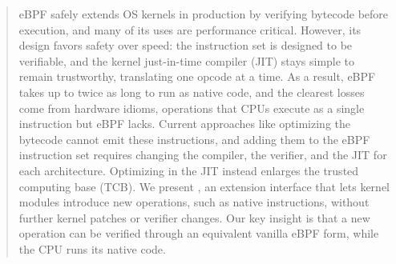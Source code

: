 \begin{abstract}
eBPF safely extends OS kernels in production by verifying bytecode before execution, and many of its uses are performance critical.
However, its design favors safety over speed: the instruction set is designed to be verifiable, and the kernel just-in-time compiler (JIT) stays simple to remain trustworthy, translating one opcode at a time.
As a result, eBPF takes up to twice as long to run as native code, and the clearest losses come from hardware idioms, operations that CPUs execute as a single instruction but eBPF lacks.
Current approaches like optimizing the bytecode cannot emit these instructions, and adding them to the eBPF instruction set requires changing the compiler, the verifier, and the JIT for each architecture.
Optimizing in the JIT instead enlarges the trusted computing base (TCB).
%
We present \tool, an extension interface that lets kernel modules introduce new operations, such as native instructions, without further kernel patches or verifier changes.
Our key insight is that a new operation can be verified through an equivalent vanilla eBPF form, while the CPU runs its native code.
%

\end{abstract}
